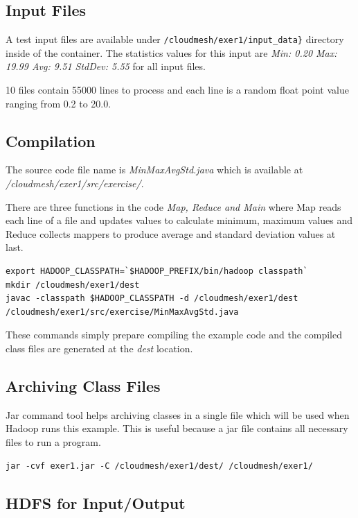 \subsection{Input Files}

A test input files are available under
\verb|/cloudmesh/exer1/input_data}|
directory inside of the container. The statistics values for this
input are \textit{Min: 0.20 Max: 19.99 Avg: 9.51 StdDev: 5.55} for all
input files.

10 files contain 55000 lines to process and each line is a random
float point value ranging from 0.2 to 20.0.

\subsection{Compilation}

The source code file name is \textit{MinMaxAvgStd.java} which is
available at \textit{/cloudmesh/exer1/src/exercise/}.

There are three functions in the code \textit{Map, Reduce and Main}
where Map reads each line of a file and updates values to calculate
minimum, maximum values and Reduce collects mappers to produce average
and standard deviation values at last.

\begin{lstlisting}
export HADOOP_CLASSPATH=`$HADOOP_PREFIX/bin/hadoop classpath`
mkdir /cloudmesh/exer1/dest
javac -classpath $HADOOP_CLASSPATH -d /cloudmesh/exer1/dest /cloudmesh/exer1/src/exercise/MinMaxAvgStd.java
\end{lstlisting}

These commands simply prepare compiling the example code and the
compiled class files are generated at the \textit{dest} location.

\subsection{Archiving Class Files}

Jar command tool helps archiving classes in a single file which will be used
when Hadoop runs this example. This is useful because a jar file contains all
necessary files to run a program.

\begin{lstlisting}
jar -cvf exer1.jar -C /cloudmesh/exer1/dest/ /cloudmesh/exer1/
\end{lstlisting}

\subsection{HDFS for Input/Output}

